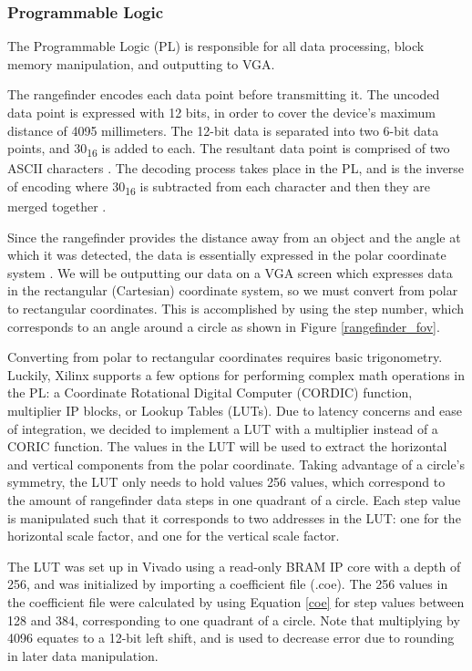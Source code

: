 \subsubsection{Programmable Logic}
The Programmable Logic (PL) is responsible for all data processing, block memory manipulation, and outputting to VGA.
\par
The rangefinder encodes each data point before transmitting it. The uncoded data point is expressed with 12 bits, in order to cover the device's maximum distance of 4095 millimeters. The 12-bit data is separated into two 6-bit data points, and 30\textsubscript{16} is added to each. The resultant data point is comprised of two ASCII characters \cite{ascii}. The decoding process takes place in the PL, and is the inverse of encoding where 30\textsubscript{16} is subtracted from each character and then they are merged together \cite{urg04lx_datasheet}.
\par
Since the rangefinder provides the distance away from an object and the angle at which it was detected, the data is essentially expressed in the polar coordinate system \cite{polar_coordinates}. We will be outputting our data on a VGA screen which expresses data in the rectangular (Cartesian) coordinate system, so we must convert from polar to rectangular coordinates. This is accomplished by using the step number, which corresponds to an angle around a circle as shown in Figure \ref{rangefinder_fov}.
\par
Converting from polar to rectangular coordinates requires basic trigonometry. Luckily, Xilinx supports a few options for performing complex math operations in the PL: a Coordinate Rotational Digital Computer (CORDIC) function, multiplier IP blocks, or Lookup Tables (LUTs). Due to latency concerns and ease of integration, we decided to implement a LUT with a multiplier instead of a CORIC function. The values in the LUT will be used to extract the horizontal and vertical components from the polar coordinate. Taking advantage of a circle's symmetry, the LUT only needs to hold values 256 values, which correspond to the amount of rangefinder data steps in one quadrant of a circle. Each step value is manipulated such that it corresponds to two addresses in the LUT: one for the horizontal scale factor, and one for the vertical scale factor.
\par
The LUT was set up in Vivado using a read-only BRAM IP core with a depth of 256, and was initialized by importing a coefficient file (.coe). The 256 values in the coefficient file were calculated by using Equation \ref{coe} for step values between 128 and 384, corresponding to one quadrant of a circle. Note that multiplying by 4096 equates to a 12-bit left shift, and is used to decrease error due to rounding in later data manipulation.

